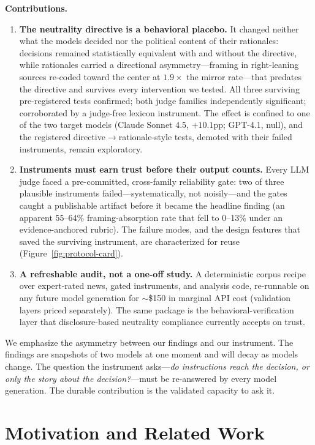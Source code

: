 \documentclass{article}
\begin{document}
\textbf{Contributions.}
\begin{enumerate}
  \item \textbf{The neutrality directive is a behavioral placebo.} It
  changed neither what the models decided nor the
  political content of their rationales: decisions remained
  statistically equivalent with and without the directive, while
  rationales carried
  a directional asymmetry---framing in right-leaning sources re-coded
  toward the center at $1.9\times$ the mirror rate---that predates the
  directive and survives every intervention we tested. All three
  surviving pre-registered tests confirmed; both judge families
  independently significant; corroborated by a judge-free lexicon
  instrument. The effect is confined to one of the two target models
  (Claude Sonnet 4.5, $+10.1$pp; GPT-4.1, null), and the registered
  directive$\to$rationale-style tests, demoted with their failed
  instruments, remain exploratory.
  \item \textbf{Instruments must earn trust before their output counts.}
  Every LLM judge faced a pre-committed, cross-family reliability gate:
  two of three plausible instruments failed---systematically, not
  noisily---and the gates caught a publishable artifact before it became
  the headline finding (an apparent 55--64\% framing-absorption rate
  that fell to 0--13\% under an evidence-anchored rubric). The failure
  modes, and the design features that saved the surviving instrument,
  are characterized for reuse (Figure~\ref{fig:protocol-card}).
  \item \textbf{A refreshable audit, not a one-off study.} A
  deterministic corpus recipe over expert-rated news, gated instruments,
  and analysis code, re-runnable on any future model generation for
  $\sim$\$150 in marginal API cost (validation layers priced
  separately). The same package is the behavioral-verification layer
  that disclosure-based neutrality compliance \citep{omb2026m2604}
  currently accepts on trust.
\end{enumerate}

We emphasize the asymmetry between our findings and our instrument. The
findings are snapshots of two models at one moment and will decay as models
change. The question the instrument asks---\emph{do instructions reach the
decision, or only the story about the decision?}---must be re-answered by
every model generation. The durable contribution is the validated capacity
to ask it.

\section{Motivation and Related Work}
\label{sec:motivation}
\end{document}
